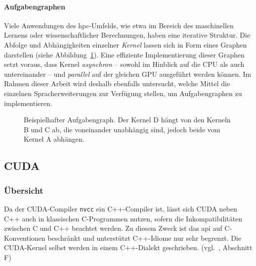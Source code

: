 \paragraph{Aufgabengraphen}

Viele Anwendungen des \gls{hpc}-Umfelds, wie etwa im Bereich des maschinellen
Lernens oder wissenschaftlicher Berechnungen, haben eine iterative Struktur. Die
Abfolge und Abhängigkeiten einzelner \textit{Kernel} lassen sich in Form eines
Graphen darstellen (siehe
Abbildung~\ref{vergleich:anforderungen:aufgabensicht:graph}). Eine effiziente
Implementierung dieser Graphen setzt voraus, dass Kernel \textit{asynchron} --
sowohl im Hinblick auf die CPU als auch untereinander -- und \textit{parallel}
auf der gleichen GPU ausgeführt werden können. Im Rahmen dieser Arbeit wird
deshalb ebenfalls untersucht, welche Mittel die einzelnen Spracherweiterungen
zur Verfügung stellen, um Aufgabengraphen zu implementieren.

\begin{figure}[htb]
    \centering
    \caption{Beispielhafter Aufgabengraph. Der Kernel D hängt von den Kerneln
             B und C ab, die voneinander unabhängig sind, jedoch beide vom
             Kernel A abhängen.}
    \label{vergleich:anforderungen:aufgabensicht:graph}
\end{figure}

\subsection{CUDA}
\label{vergleich:cuda}

\subsubsection{Übersicht}
\label{vergleich:cuda:uebersicht}

Da der CUDA-Compiler \texttt{nvcc} ein C++-Compiler ist, lässt sich CUDA neben
C++ auch in klassischen C-Programmen nutzen, sofern die Inkompatibilitäten
zwischen C und C++ beachtet werden. Zu diesem Zweck ist das \gls{api} auf
C-Konventionen beschränkt und unterstützt C++-Idiome nur sehr begrenzt. Die
CUDA-Kernel selbst werden in einem C++-Dialekt geschrieben.
(vgl.~\cite{cudaguide}, Abschnitt F)

